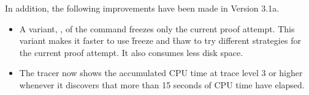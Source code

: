 In addition, the following improvements have been made in Version 3.1a.

\begin{itemize}
\item
A variant, , of the 
command freezes only the current proof attempt.  This variant makes it faster
to use \f{freeze} and \f{thaw} to try different strategies for the current
proof attempt.  It also consumes less disk space.
\item
The tracer now shows the accumulated CPU time at trace level 3 or higher
whenever it discovers that more than 15 seconds of CPU time have elapsed.
\end{itemize}
